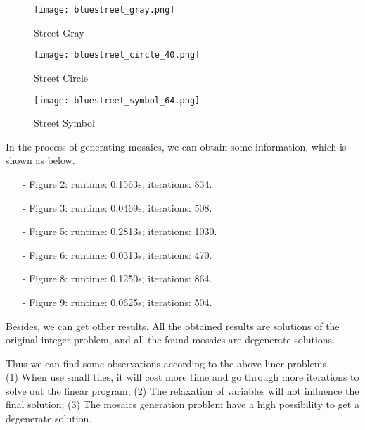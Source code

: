 \documentclass[12pt,a4paper]{article}
\begin{document}
\begin{figure}[htbp]
	\centering
	\begin{minipage}[t]{0.32\linewidth}
		\centering
		\texttt{[image: bluestreet\_gray.png]}
		\caption{Street Gray}
	\end{minipage}
	\begin{minipage}[t]{0.32\linewidth}
		\centering
		\texttt{[image: bluestreet\_circle\_40.png]}
		\caption{Street Circle}
	\end{minipage}
	\begin{minipage}[t]{0.32\linewidth}
		\centering
		\texttt{[image: bluestreet\_symbol\_64.png]}
		\caption{Street Symbol}
	\end{minipage}                        
\end{figure}		
\indent In the process of generating mosaics, we can obtain some information, which is shown as below.	
\begin{itemize}
	\item[-] Figure 2: runtime: 0.1563s;\; iterations: 834.
	\item[-] Figure 3: runtime: 0.0469s;\; iterations: 508.
	\item[-] Figure 5: runtime: 0.2813s;\; iterations: 1030.
	\item[-] Figure 6: runtime: 0.0313s;\; iterations: 470.
	\item[-] Figure 8: runtime: 0.1250s;\; iterations: 864.
	\item[-] Figure 9: runtime: 0.0625s;\; iterations: 504.
\end{itemize}

\indent Besides, we can get other results. All the obtained results are solutions of the original integer problem, and all the found mosaics are degenerate solutions.\\
\par Thus we can find some observations according to the above liner problems.\\
(1) When use small tiles, it will cost more time and go through more iterations to solve out the linear program; (2) The relaxation of variables will not influence the final solution;  (3) The mosaics generation problem have a high possibility to get a degenerate solution.
\thispagestyle{empty}
\end{document}

